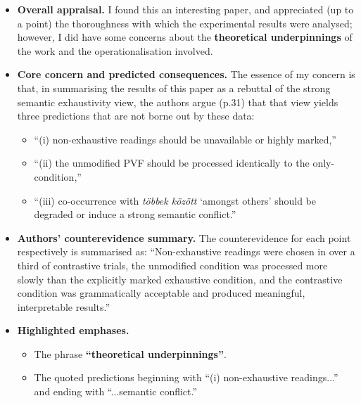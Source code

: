\documentclass[a4paper, ruler]{CUP-JNL-LIN}%
\begin{document}
\begin{itemize}
  \item \textbf{Overall appraisal.} I found this an interesting paper, and appreciated (up to a point) the thoroughness with which the experimental results were analysed; however, I did have some concerns about the \textbf{theoretical underpinnings} of the work and the operationalisation involved.
  
  \item \textbf{Core concern and predicted consequences.} The essence of my concern is that, in summarising the results of this paper as a rebuttal of the strong semantic exhaustivity view, the authors argue (p.31) that that view yields three predictions that are not borne out by these data:
    \begin{itemize}
      \item ``(i) non-exhaustive readings should be unavailable or highly marked,''
      \item ``(ii) the unmodified PVF should be processed identically to the only-condition,''
      \item ``(iii) co-occurrence with \emph{többek között} `amongst others' should be degraded or induce a strong semantic conflict.''
    \end{itemize}
  \item \textbf{Authors' counterevidence summary.} The counterevidence for each point respectively is summarised as: ``Non-exhaustive readings were chosen in over a third of contrastive trials, the unmodified condition was processed more slowly than the explicitly marked exhaustive condition, and the contrastive condition was grammatically acceptable and produced meaningful, interpretable results.''
  \item \textbf{Highlighted emphases.}
    \begin{itemize}
      \item The phrase \textbf{``theoretical underpinnings''}.
      \item The quoted predictions beginning with ``(i) non-exhaustive readings...'' and ending with ``...semantic conflict.''
    \end{itemize}
\end{itemize}
\end{document}
